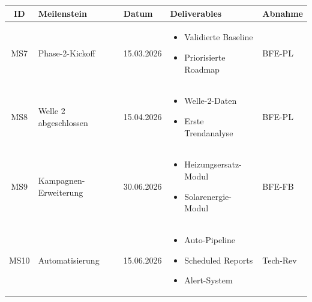 \documentclass[11pt,a4paper]{article}
\begin{document}
\begin{longtable}{c l l p{5cm} l}
\toprule
\textbf{ID} & \textbf{Meilenstein} & \textbf{Datum} & \textbf{Deliverables} & \textbf{Abnahme}\\
\midrule
\endhead

\rowcolor{falightgray}
MS7 & Phase-2-Kickoff & 15.03.2026 &
    \begin{minipage}[t]{5cm}
    \vspace{0.1cm}
    \begin{itemize}[leftmargin=*, nosep]
        \item Validierte Baseline
        \item Priorisierte Roadmap
    \end{itemize}
    \vspace{0.1cm}
    \end{minipage} & BFE-PL\\

MS8 & Welle 2 abgeschlossen & 15.04.2026 &
    \begin{minipage}[t]{5cm}
    \vspace{0.1cm}
    \begin{itemize}[leftmargin=*, nosep]
        \item Welle-2-Daten
        \item Erste Trendanalyse
    \end{itemize}
    \vspace{0.1cm}
    \end{minipage} & BFE-PL\\

\rowcolor{falightgray}
MS9 & Kampagnen-Erweiterung & 30.06.2026 &
    \begin{minipage}[t]{5cm}
    \vspace{0.1cm}
    \begin{itemize}[leftmargin=*, nosep]
        \item Heizungsersatz-Modul
        \item Solarenergie-Modul
    \end{itemize}
    \vspace{0.1cm}
    \end{minipage} & BFE-FB\\

MS10 & Automatisierung & 15.06.2026 &
    \begin{minipage}[t]{5cm}
    \vspace{0.1cm}
    \begin{itemize}[leftmargin=*, nosep]
        \item Auto-Pipeline
        \item Scheduled Reports
        \item Alert-System
    \end{itemize}
    \vspace{0.1cm}
    \end{minipage} & Tech-Rev\\


\end{longtable}
\end{document}
